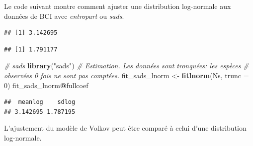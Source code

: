 \documentclass[
  11pt,
  french,
  a4paper,
  extrafontsizes,onecolumn,openright
  ]{memoir}
\newenvironment{Shaded}{\begin{snugshade}}{\end{snugshade}}
\newcommand{\AttributeTok}[1]{\textcolor[rgb]{0.13,0.29,0.53}{#1}}
\newcommand{\CommentTok}[1]{\textcolor[rgb]{0.56,0.35,0.01}{\textit{#1}}}
\newcommand{\DecValTok}[1]{\textcolor[rgb]{0.00,0.00,0.81}{#1}}
\newcommand{\FunctionTok}[1]{\textcolor[rgb]{0.13,0.29,0.53}{\textbf{#1}}}
\newcommand{\NormalTok}[1]{#1}
\newcommand{\OtherTok}[1]{\textcolor[rgb]{0.56,0.35,0.01}{#1}}
\newcommand{\SpecialCharTok}[1]{\textcolor[rgb]{0.81,0.36,0.00}{\textbf{#1}}}
\newcommand{\StringTok}[1]{\textcolor[rgb]{0.31,0.60,0.02}{#1}}
\begin{document}
Le code suivant montre comment ajuster une distribution log-normale aux données de BCI avec \emph{entropart} ou \emph{sads}.

\scriptsize

\begin{Shaded}
\end{Shaded}

\begin{verbatim}
## [1] 3.142695
\end{verbatim}

\begin{Shaded}
\end{Shaded}

\begin{verbatim}
## [1] 1.791177
\end{verbatim}

\begin{Shaded}
\begin{Highlighting}[]
\CommentTok{\# sads}
\FunctionTok{library}\NormalTok{(}\StringTok{"sads"}\NormalTok{)}
\CommentTok{\# Estimation. Les données sont tronquées: les espèces}
\CommentTok{\# observées 0 fois ne sont pas comptées.}
\NormalTok{fit\_sads\_lnorm }\OtherTok{\textless{}{-}} \FunctionTok{fitlnorm}\NormalTok{(Ns, }\AttributeTok{trunc =} \DecValTok{0}\NormalTok{)}
\NormalTok{fit\_sads\_lnorm}\SpecialCharTok{@}\NormalTok{fullcoef}
\end{Highlighting}
\end{Shaded}

\begin{verbatim}
##  meanlog    sdlog 
## 3.142695 1.787195
\end{verbatim}

\normalsize

L'ajustement du modèle de Volkov peut être comparé à celui d'une distribution log-normale.

\scriptsize
\end{document}
